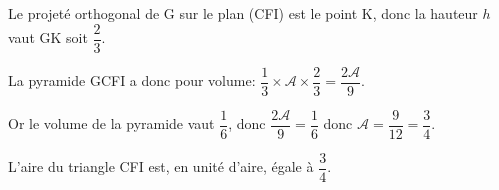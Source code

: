 \begin{enumerate}
\begin{enumerate}
Le projeté orthogonal de G sur le plan (CFI) est le point K, donc la hauteur $h$ vaut GK soit $\dfrac{2}{3}$.

La pyramide GCFI a donc pour volume:  $\dfrac{1}{3}\times \mathcal{A}\times \dfrac{2}{3} = \dfrac{2\mathcal{A}}{9}$.

Or le volume de la pyramide vaut $\dfrac{1}{6}$, donc $\dfrac{2\mathcal{A}}{9} = \dfrac{1}{6}$ donc $\mathcal{A}=\dfrac{9}{12}=\dfrac{3}{4}$.

L'aire du triangle CFI est, en unité d'aire, égale à $\dfrac{3}{4}$.
		
	\end{enumerate}
\end{enumerate}

